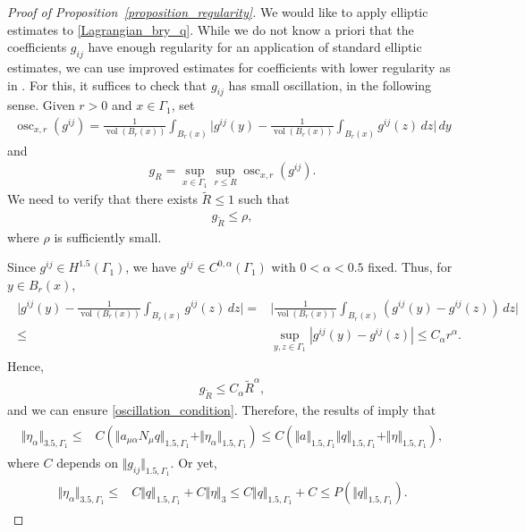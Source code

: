 \documentclass[10pt,reqno]{amsart}
\theoremstyle{plain}
\theoremstyle{definition}
\numberwithin{equation}{section}
\newcommand{\al}{\alpha}
\newcommand{\Ga}{\Gamma}
\newcommand{\vol}{\operatorname{vol}}
\newcommand{\norm}[1]{\Vert#1\Vert}
\begin{document}
\begin{proof}[Proof of Proposition~\ref{proposition_regularity}]
We would like to apply elliptic estimates to \eqref{Lagrangian_bry_q}. While
we do not know a priori that the coefficients $g_{ij}$
 have enough regularity for an application of standard elliptic estimates, we 
can use improved estimates for coefficients with lower regularity
as in \cite{DongKimEllipticBMOHigerOrder}. For this, it suffices to check that
$g_{ij}$ has small oscillation, in the following sense.
Given $ r>0$ and $x \in \Ga_1$, set 
\begin{gather}
\operatorname{osc}_{x,r} (g^{ij}) = 
\frac{1}{\vol(B_r(x))} \int_{B_r(x)} \Big | g^{ij}(y) -
\frac{1}{\vol(B_r(x)) } \int_{B_r(x)} g^{ij} (z)\, dz \Big | \, dy
\nonumber
\end{gather} 
and 
\begin{gather}
g_R = \sup_{x \in \Ga_1} \sup_{r \leq R} \operatorname{osc}_{x,r} (g^{ij}) .
\nonumber
\end{gather}
We need to verify that there exists  $\widetilde{R} \leq 1$ such that 
\begin{gather}
g_{\widetilde{R}}  \leq \rho,
\label{oscillation_condition}
\end{gather}
where $\rho$ is sufficiently small.

Since $g^{ij} \in H^{1.5}(\Ga_1)$, we have  $g^{ij} \in C^{0,\al}(\Ga_1)$ with 
$0< \al < 0.5$ fixed. Thus, for $y \in B_r(x)$,
\begin{align}
\begin{split}
\Big | g^{ij}(y) -
\frac{1}{\vol(B_r(x)) } \int_{B_r(x)} g^{ij} (z)\, dz \Big |
= &
\Big | 
\frac{1}{\vol(B_r(x)) } \int_{B_r(x)} ( g^{ij}(y) -
 g^{ij} (z) )\, dz \Big |
 \\
 \leq &
 \sup_{y,z \in \Ga_1}
 |g^{ij}(y) -
 g^{ij} (z) |
 \leq 
C_{\alpha} r^\al.
\end{split}
\nonumber
\end{align}
Hence,
\begin{gather}
g_{\widetilde{R}} \leq C_{\alpha} \widetilde R^\al,
\nonumber
\end{gather}
and we can ensure \eqref{oscillation_condition}. Therefore, the results of 
\cite{DongKimEllipticBMOHigerOrder} imply that
\begin{align}
\begin{split}
\norm{ \eta_\al }_{3.5,\Ga_1} 
\leq & C( \norm{a_{\mu \al} N_\mu q }_{1.5,\Ga_1}
+ \norm{\eta_{\alpha}}_{1.5,\Ga_1} ) 
\leq
C (\norm{a}_{1.5,\Ga_1} \norm{q}_{1.5,\Ga_1} + \norm{\eta}_{1.5,\Ga_1} ),
\end{split}
\nonumber
\end{align}
where $C$ depends on $\norm{ g_{ij} }_{1.5,\Ga_1}$. Or yet,
\begin{align}
\begin{split}
\norm{ \eta_\al }_{3.5,\Ga_1} 
\leq & C  \norm{ q }_{1.5,\Ga_1}
+ C\norm{\eta}_3 
\leq   C  \norm{q}_{1.5,\Ga_1} + C
\leq  P(\norm{q}_{1.5,\Ga_1}).
\end{split}
\nonumber
\end{align}


\end{proof}
\end{document}
